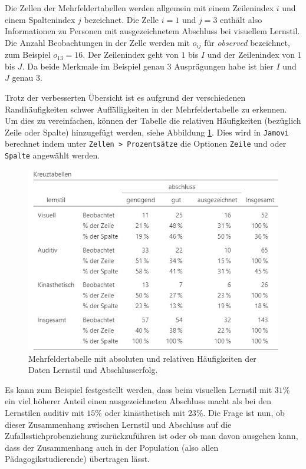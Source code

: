 \documentclass[
]{book}
\theoremstyle{definition}
\theoremstyle{definition}
\theoremstyle{definition}
\theoremstyle{definition}
\theoremstyle{remark}
\begin{document}
Die Zellen der Mehrfeldertabellen werden allgemein mit einem Zeilenindex \(i\) und einem Spaltenindex \(j\) bezeichnet. Die Zelle \(i = 1\) und \(j = 3\) enthält also Informationen zu Personen mit ausgezeichnetem Abschluss bei visuellem Lernstil. Die Anzahl Beobachtungen in der Zelle werden mit \(o_{ij}\) für \emph{observed} bezeichnet, zum Beispiel \(o_{13} = 16\). Der Zeilenindex geht von \(1\) bis \(I\) und der Zeilenindex von \(1\) bis \(J\). Da beide Merkmale im Beispiel genau \(3\) Ausprägungen habe ist hier \(I\) und \(J\) genau \(3\).

Trotz der verbesserten Übersicht ist es aufgrund der verschiedenen Randhäufigkeiten schwer Auffälligkeiten in der Mehrfeldertabelle zu erkennen. Um dies zu vereinfachen, können der Tabelle die relativen Häufigkeiten (bezüglich Zeile oder Spalte) hinzugefügt werden, siehe Abbildung \ref{fig:exm-learning-style-data-view-rel}. Dies wird in \texttt{Jamovi} berechnet indem unter \texttt{Zellen\ \textgreater{}\ Prozentsätze} die Optionen \texttt{Zeile} und oder \texttt{Spalte} angewählt werden.

\begin{figure}

{\centering \includegraphics{figures/10-exm-learning-style-data-view-rel} 

}

\caption{Mehrfeldertabelle mit absoluten und relativen Häufigkeiten der Daten Lernstil und Abschlusserfolg.}\label{fig:exm-learning-style-data-view-rel}
\end{figure}

Es kann zum Beispiel festgestellt werden, dass beim visuellen Lernstil mit \(31\%\) ein viel höherer Anteil einen ausgezeichneten Abschluss macht als bei den Lernstilen auditiv mit \(15\%\) oder kinästhetisch mit \(23\%\). Die Frage ist nun, ob dieser Zusammenhang zwischen Lernstil und Abschluss auf die Zufallsstichprobenziehung zurückzuführen ist oder ob man davon ausgehen kann, dass der Zusammenhang auch in der Population (also allen Pädagogikstudierende) übertragen lässt.
\end{document}

